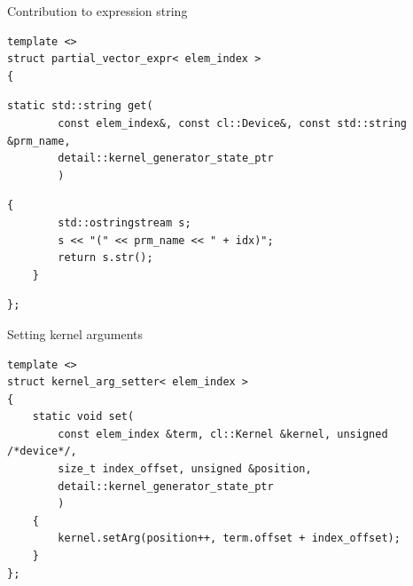 \documentclass[@BEAMER_OPTIONS@]{beamer}
\begin{document}
\begin{frame}[fragile]{Contribution to expression string}
    \begin{exampleblock}{}
            \begin{lstlisting}
template <>
struct partial_vector_expr< elem_index >
{
    \end{lstlisting}
    \begin{lstlisting}[firstnumber=last]
    static std::string get(
        const elem_index&, const cl::Device&, const std::string &prm_name,
        detail::kernel_generator_state_ptr
        )
    \end{lstlisting}
    \begin{lstlisting}[firstnumber=last]
    {
        std::ostringstream s;
        s << "(" << prm_name << " + idx)";
        return s.str();
    }
    \end{lstlisting}
    \begin{lstlisting}[firstnumber=last]
};
            \end{lstlisting}
    \end{exampleblock}
\end{frame}

\note{ }

\begin{frame}[fragile]{Setting kernel arguments}
    \begin{exampleblock}{}
        \begin{lstlisting}
template <>
struct kernel_arg_setter< elem_index >
{
    static void set(
        const elem_index &term, cl::Kernel &kernel, unsigned /*device*/,
        size_t index_offset, unsigned &position,
        detail::kernel_generator_state_ptr
        )
    {
        kernel.setArg(position++, term.offset + index_offset);
    }
};
        \end{lstlisting}
    \end{exampleblock}
\end{frame}

\note{ }
\end{document}
